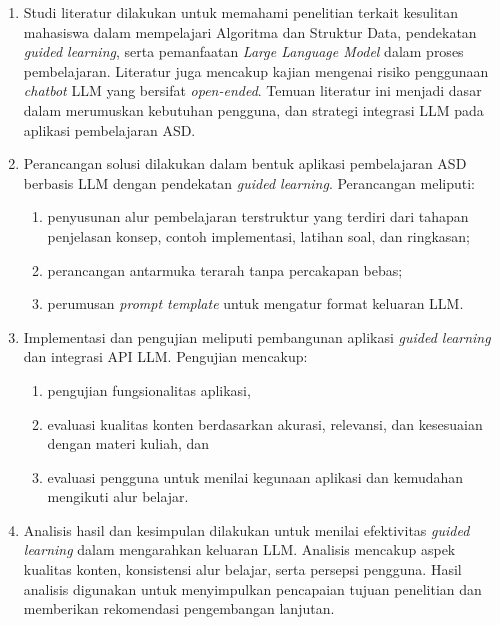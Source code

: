 \begin{enumerate}
    \item Studi literatur dilakukan untuk memahami penelitian terkait kesulitan mahasiswa dalam mempelajari Algoritma dan Struktur Data, pendekatan \textit{guided learning}, serta pemanfaatan \textit{Large Language Model} dalam proses pembelajaran. Literatur juga mencakup kajian mengenai risiko penggunaan \textit{chatbot} LLM yang bersifat \textit{open-ended}. Temuan literatur ini menjadi dasar dalam merumuskan kebutuhan pengguna, dan strategi integrasi LLM pada aplikasi pembelajaran ASD.

    \item Perancangan solusi dilakukan dalam bentuk aplikasi pembelajaran ASD berbasis LLM dengan pendekatan \textit{guided learning}. Perancangan meliputi:
    \begin{enumerate}
        \item penyusunan alur pembelajaran terstruktur yang terdiri dari tahapan penjelasan konsep, contoh implementasi, latihan soal, dan ringkasan;
        \item perancangan antarmuka terarah tanpa percakapan bebas;
        \item perumusan \textit{prompt template} untuk mengatur format keluaran LLM.
    \end{enumerate}

    \item Implementasi dan pengujian meliputi pembangunan aplikasi \textit{guided learning} dan integrasi API LLM. Pengujian mencakup:
    \begin{enumerate}
        \item pengujian fungsionalitas aplikasi,
        \item evaluasi kualitas konten berdasarkan akurasi, relevansi, dan kesesuaian dengan materi kuliah, dan
        \item evaluasi pengguna untuk menilai kegunaan aplikasi dan kemudahan mengikuti alur belajar.
    \end{enumerate}

    \item Analisis hasil dan kesimpulan dilakukan untuk menilai efektivitas \textit{guided learning} dalam mengarahkan keluaran LLM. Analisis mencakup aspek kualitas konten, konsistensi alur belajar, serta persepsi pengguna. Hasil analisis digunakan untuk menyimpulkan pencapaian tujuan penelitian dan memberikan rekomendasi pengembangan lanjutan.
\end{enumerate}

